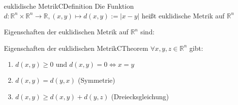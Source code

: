 \documentclass[a4paper]{memoir}
\begin{document}
\begin{ibox}{euklidische Metrik}{CDefinition}
    Die Funktion $ d: \mathbb{R}^{n}\times \mathbb{R}^{n} \to \mathbb{R}
, (x,y) \mapsto d(x,y) := |x-y|$ heißt euklidische Metrik auf
$ \mathbb{R}^{n}$
\end{ibox}
Eigenschaften der euklidischen Metrik auf $ \mathbb{R}^{n} $ sind:
\begin{ibox}{Eigenschaften der euklidischen Metrik}{CTheorem}
    $ \forall x,y,z \in \mathbb{R}^{n} $ gibt:
    \begin{enumerate}[label=\alph*)]
        \item $ d(x,y) \geq 0 \text{ und } d(x,y) = 0 \iff x = y $ 
        \item $ d(x,y) = d(y,x) $ (Symmetrie)
        \item $ d(x,y) \geq d(x,y) + d(y,z) $ (Dreiecksgleichung)
    \end{enumerate}
    
\end{ibox}
\end{document}
